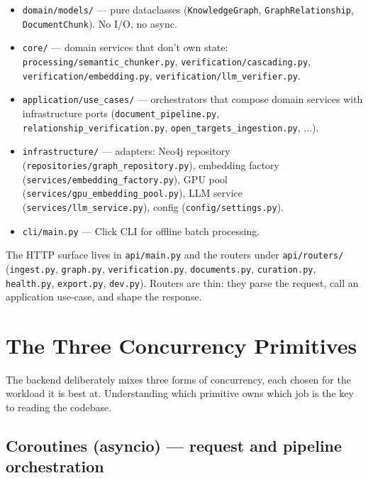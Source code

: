 \documentclass[11pt,a4paper]{article}
\begin{document}
\begin{itemize}[leftmargin=*]
  \item \texttt{domain/models/} --- pure dataclasses
        (\texttt{KnowledgeGraph}, \texttt{GraphRelationship},
        \texttt{DocumentChunk}). No I/O, no async.
  \item \texttt{core/} --- domain services that don't own state:
        \texttt{processing/semantic\_chunker.py},
        \texttt{verification/cascading.py},
        \texttt{verification/embedding.py},
        \texttt{verification/llm\_verifier.py}.
  \item \texttt{application/use\_cases/} --- orchestrators that compose
        domain services with infrastructure ports
        (\texttt{document\_pipeline.py},
        \texttt{relationship\_verification.py},
        \texttt{open\_targets\_ingestion.py}, ...).
  \item \texttt{infrastructure/} --- adapters: Neo4j repository
        (\texttt{repositories/graph\_repository.py}), embedding factory
        (\texttt{services/embedding\_factory.py}), GPU pool
        (\texttt{services/gpu\_embedding\_pool.py}), LLM service
        (\texttt{services/llm\_service.py}), config
        (\texttt{config/settings.py}).
  \item \texttt{cli/main.py} --- Click CLI for offline batch processing.
\end{itemize}

The HTTP surface lives in \texttt{api/main.py} and the routers under
\texttt{api/routers/} (\texttt{ingest.py}, \texttt{graph.py},
\texttt{verification.py}, \texttt{documents.py}, \texttt{curation.py},
\texttt{health.py}, \texttt{export.py}, \texttt{dev.py}). Routers are
thin: they parse the request, call an application use-case, and shape
the response.

\section{The Three Concurrency Primitives}

The backend deliberately mixes three forms of concurrency, each chosen
for the workload it is best at. Understanding which primitive owns which
job is the key to reading the codebase.

\subsection{Coroutines (asyncio) --- request and pipeline orchestration}
\end{document}
